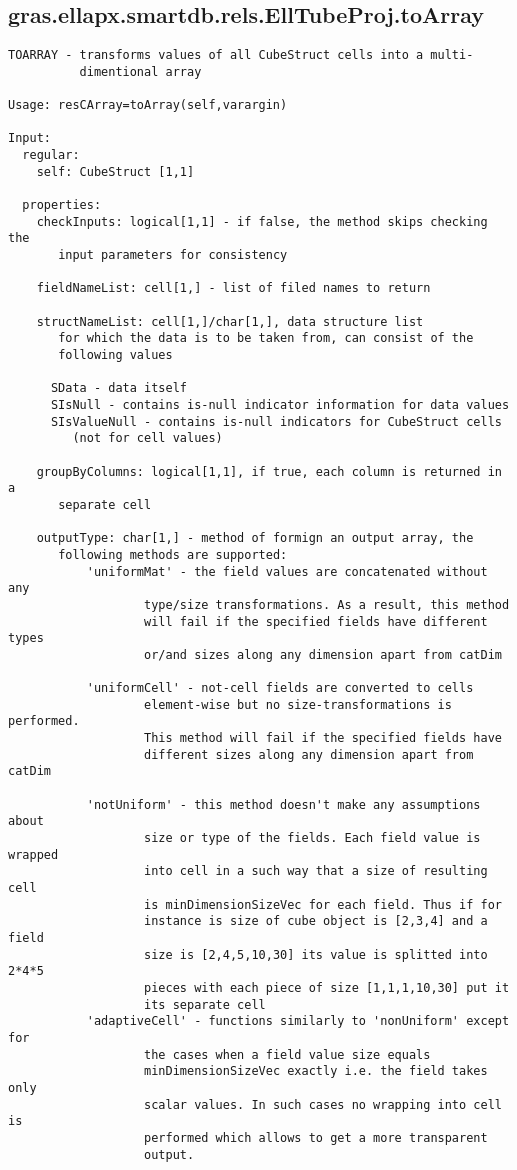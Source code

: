 \subsection{\texorpdfstring{gras.ellapx.smartdb.rels.EllTubeProj.toArray}{toArray}}\label{method:gras.ellapx.smartdb.rels.EllTubeProj.toArray}
\begin{verbatim}
TOARRAY - transforms values of all CubeStruct cells into a multi-
          dimentional array

Usage: resCArray=toArray(self,varargin)

Input:
  regular:
    self: CubeStruct [1,1]

  properties:
    checkInputs: logical[1,1] - if false, the method skips checking the
       input parameters for consistency

    fieldNameList: cell[1,] - list of filed names to return

    structNameList: cell[1,]/char[1,], data structure list
       for which the data is to be taken from, can consist of the
       following values

      SData - data itself
      SIsNull - contains is-null indicator information for data values
      SIsValueNull - contains is-null indicators for CubeStruct cells
         (not for cell values)

    groupByColumns: logical[1,1], if true, each column is returned in a
       separate cell

    outputType: char[1,] - method of formign an output array, the
       following methods are supported:
           'uniformMat' - the field values are concatenated without any
                   type/size transformations. As a result, this method
                   will fail if the specified fields have different types
                   or/and sizes along any dimension apart from catDim

           'uniformCell' - not-cell fields are converted to cells
                   element-wise but no size-transformations is performed.
                   This method will fail if the specified fields have
                   different sizes along any dimension apart from catDim

           'notUniform' - this method doesn't make any assumptions about
                   size or type of the fields. Each field value is wrapped
                   into cell in a such way that a size of resulting cell
                   is minDimensionSizeVec for each field. Thus if for
                   instance is size of cube object is [2,3,4] and a field
                   size is [2,4,5,10,30] its value is splitted into 2*4*5
                   pieces with each piece of size [1,1,1,10,30] put it
                   its separate cell
           'adaptiveCell' - functions similarly to 'nonUniform' except for
                   the cases when a field value size equals
                   minDimensionSizeVec exactly i.e. the field takes only
                   scalar values. In such cases no wrapping into cell is
                   performed which allows to get a more transparent
                   output.


\end{verbatim}
